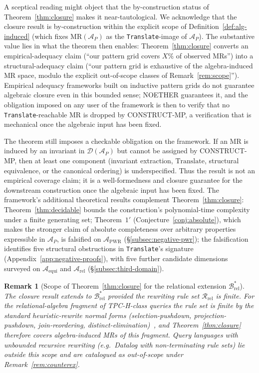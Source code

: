 \documentclass[acmsmall,screen,review]{acmart}
\newtheorem{remark}{Remark}
\begin{document}
A sceptical reading might object that the by-construction status of Theorem~\ref{thm:closure} makes it near-tautological. We acknowledge that the closure result is by-construction within the explicit scope of Definition~\ref{def:alg-induced} (which fixes $\mathrm{MR}(\mathcal{A}_P)$ as the \texttt{Translate}-image of $\mathcal{A}_P$). The substantive value lies in what the theorem then enables: Theorem~\ref{thm:closure} converts an empirical-adequacy claim (``our pattern grid covers $X\%$ of observed MRs'') into a structural-adequacy claim (``our pattern grid is exhaustive of the algebra-induced MR space, modulo the explicit out-of-scope classes of Remark~\ref{rem:scope}''). Empirical adequacy frameworks built on inductive pattern grids do not guarantee algebraic closure even in this bounded sense; NOETHER guarantees it, and the obligation imposed on any user of the framework is then to verify that no \texttt{Translate}-reachable MR is dropped by CONSTRUCT-MP, a verification that is mechanical once the algebraic input has been fixed.

The theorem still imposes a checkable obligation on the framework. If an MR is induced by an invariant in $\mathcal{D}(\mathcal{A}_P)$ but cannot be assigned by CONSTRUCT-MP, then at least one component (invariant extraction, $\mathrm{Translate}$, structural equivalence, or the canonical ordering) is underspecified. Thus the result is not an empirical coverage claim; it is a well-formedness and closure guarantee for the downstream construction once the algebraic input has been fixed. The framework's additional theoretical results complement Theorem~\ref{thm:closure}: Theorem~\ref{thm:decidable} bounds the construction's polynomial-time complexity under a finite generating set; Theorem~$1'$ (Conjecture~\ref{conj:absolute}), which makes the stronger claim of absolute completeness over arbitrary properties expressible in $\mathcal{A}_P$, is falsified on $\mathcal{A}_{\mathrm{PWR}}$ (\S\ref{subsec:negative-pwr}); the falsification identifies five structural obstructions in \texttt{Translate}'s signature (Appendix~\ref{app:negative-proofs}), with five further candidate dimensions surveyed on $\mathcal{A}_{\mathrm{equi}}$ and $\mathcal{A}_{\mathrm{rel}}$ (\S\ref{subsec:third-domain}).

\begin{remark}[Scope of Theorem~\ref{thm:closure} for the relational extension $\mathcal{B}^{*}_{\mathrm{rel}}$]
\label{rem:closure-brel}
The closure result extends to $\mathcal{B}^{*}_{\mathrm{rel}}$ provided the rewriting rule set $\mathcal{R}_{\mathrm{rel}}$ is finite. For the relational-algebra fragment of TPC-H-class queries the rule set is finite by the standard heuristic-rewrite normal forms (selection-pushdown, projection-pushdown, join-reordering, distinct-elimination)~\cite{Wang2024QED, Zhou2022SPES}, and Theorem~\ref{thm:closure} therefore covers algebra-induced MRs of this fragment. Query languages with unbounded recursive rewriting (e.g.\ Datalog with non-terminating rule sets) lie outside this scope and are catalogued as out-of-scope under Remark~\ref{rem:counterex}.
\end{remark}
\end{document}
